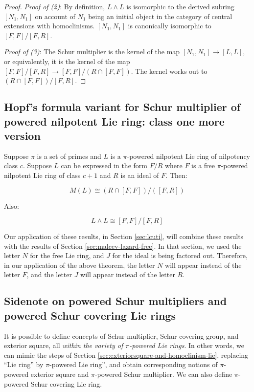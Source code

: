 \documentclass{ucetd}
\begin{document}
\begin{proof}
  {\em Proof of (2)}: By definition, $L \wedge L$ is isomorphic to the
  derived subring $[N_1,N_1]$ on account of $N_1$ being an initial
  object in the category of central extensions with
  homoclinisms. $[N_1,N_1]$ is canonically isomorphic to
  $[F,F]/[F,R]$.

  {\em Proof of (3)}: The Schur multiplier is the kernel of the map
  $[N_1,N_1] \to [L,L]$, or equivalently, it is the kernel of the map
  $[F,F]/[F,R] \to [F,F]/(R \cap [F,F])$. The kernel works out to $(R
  \cap [F,F])/[F,R]$.
\end{proof}

\subsection{Hopf's formula variant for Schur multiplier of powered nilpotent Lie ring: class one more version}\label{sec:hopf-formula-pi-powered-class-one-more-lie}

Suppose $\pi$ is a set of primes and $L$ is a $\pi$-powered nilpotent
Lie ring of nilpotency class $c$. Suppose $L$ can be expressed in the
form $F/R$ where $F$ is a free $\pi$-powered nilpotent Lie ring of class
$c + 1$ and $R$ is an ideal of $F$. Then:

\begin{equation}\label{eq:pi-powered-hopf-formula-class-one-more-lie}
  M(L) \cong (R \cap [F,F])/([F,R])
\end{equation}

Also:

\begin{equation}\label{eq:pi-powered-exteriorsquare-hopf-formula-class-one-more-lie}
  L \wedge L \cong [F,F]/[F,R]
\end{equation}

Our application of these results, in Section \ref{sec:lcuti}, will
combine these results with the results of Section
\ref{sec:malcev-lazard-free}. In that section, we used the letter $N$
for the free Lie ring, and $J$ for the ideal is being factored
out. Therefore, in our application of the above theorem, the letter
$N$ will appear instead of the letter $F$, and the letter $J$ will
appear instead of the letter $R$.

\subsection{Sidenote on powered Schur multipliers and powered Schur covering Lie rings}

It is possible to define concepts of Schur multiplier, Schur covering
group, and exterior square, all {\em within the variety of
  $\pi$-powered Lie rings}. In other words, we can mimic the steps of
Section \ref{sec:exteriorsquare-and-homoclinism-lie}, replacing ``Lie
ring'' by $\pi$-powered Lie ring'', and obtain corresponding notions
of $\pi$-powered exterior square and $\pi$-powered Schur
multiplier. We can also define $\pi$-powered Schur covering Lie ring.
\end{document}
